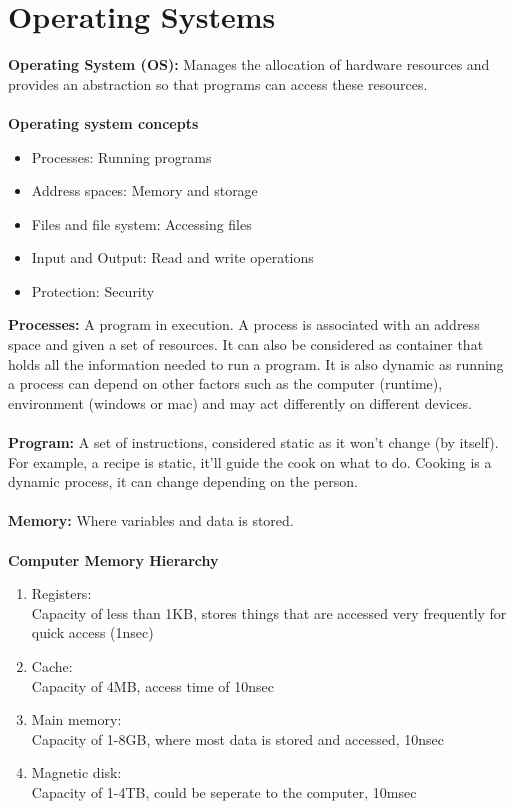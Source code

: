 \documentclass[a4paper,10pt]{article}
\begin{document}
\section{Operating Systems}
\textcolor{WildStrawberry}{\textbf{Operating System (OS):}} Manages the allocation of hardware resources and provides an abstraction so that programs can access these resources. \\\\
\textbf{Operating system concepts} 
\renewcommand{\labelitemi}{\textperiodcentered}
\begin{itemize}
\item \textcolor{WildStrawberry}{Processes:} Running programs 
\item \textcolor{WildStrawberry}{Address spaces:} Memory and storage
\item \textcolor{WildStrawberry}{Files and file system:} Accessing files
\item \textcolor{WildStrawberry}{Input and Output:} Read and write operations
\item \textcolor{WildStrawberry}{Protection:} Security 
\end{itemize}
\textcolor{WildStrawberry}{\textbf{Processes:}} A program in execution. A process is associated with an address space and given a set of resources. It can also be considered as container that holds all the information needed to run a program. It is also dynamic as running a process can depend on other factors such as the computer (runtime), environment (windows or mac) and may act differently on different devices. \\\\
\textcolor{WildStrawberry}{\textbf{Program:}} A set of instructions, considered static as it won't change (by itself). For example, a recipe is static, it'll guide the cook on what to do. Cooking is a dynamic process, it can change depending on the person. \\\\
\textcolor{WildStrawberry}{\textbf{Memory:}} Where variables and data is stored.  \\\\
\textbf{Computer Memory Hierarchy} 
\begin{enumerate}
\item \textcolor{WildStrawberry}{Registers:}\\
Capacity of less than 1KB, stores things that are accessed very frequently for quick access (1nsec)
\item \textcolor{WildStrawberry}{Cache:}\\
Capacity of 4MB, access time of 10nsec
\item \textcolor{WildStrawberry}{Main memory:} \\
Capacity of 1-8GB, where most data is stored and accessed, 10nsec 
\item \textcolor{WildStrawberry}{Magnetic disk:}\\
Capacity of 1-4TB, could be seperate to the computer, 10msec 
\end{enumerate}
\end{document}
